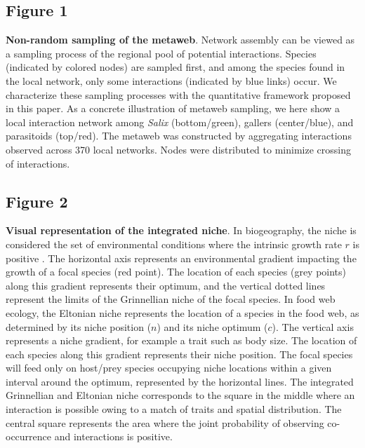 \documentclass[12pt]{article}
\begin{document}
\subsection*{Figure 1}

\textbf{Non-random sampling of the metaweb}. Network assembly can be viewed
as a sampling process of the regional pool of potential interactions. Species
(indicated by colored nodes) are sampled first, and among the species found in
the local network, only some interactions (indicated by blue links) occur.
We characterize these sampling processes with the quantitative framework
proposed in this paper. As a concrete illustration of metaweb sampling, we
here show a local interaction network among \textit{Salix} (bottom/green), gallers
(center/blue), and parasitoids (top/red). The metaweb was constructed by
aggregating interactions observed across 370 local networks. Nodes were distributed
to minimize crossing of interactions.

\subsection*{Figure 2}

\textbf{Visual representation of the integrated niche}. In biogeography, the
niche is considered the set of environmental conditions where the intrinsic
growth rate $r$ is positive \citep{Holt2009a}. The horizontal axis represents
an environmental gradient impacting the growth of a focal species (red point).
The location of each species (grey points) along this gradient represents their
optimum, and the vertical dotted lines represent the limits of the Grinnellian
niche of the focal species. In food web ecology, the Eltonian niche represents
the location of a species in the food web, as determined by its niche position
($n$) and its niche optimum ($c$). The vertical axis represents a niche
gradient, for example a trait such as body size. The location of each species
along this gradient represents their niche position. The focal species will
feed only on host/prey species occupying niche locations within a given interval
around the optimum, represented by the horizontal lines. The integrated
Grinnellian and Eltonian niche corresponds to the square in the middle where
an interaction is possible owing to a match of traits and spatial
distribution. The central square represents the area where the joint
probability of observing co-occurrence and interactions is positive.
\end{document}
